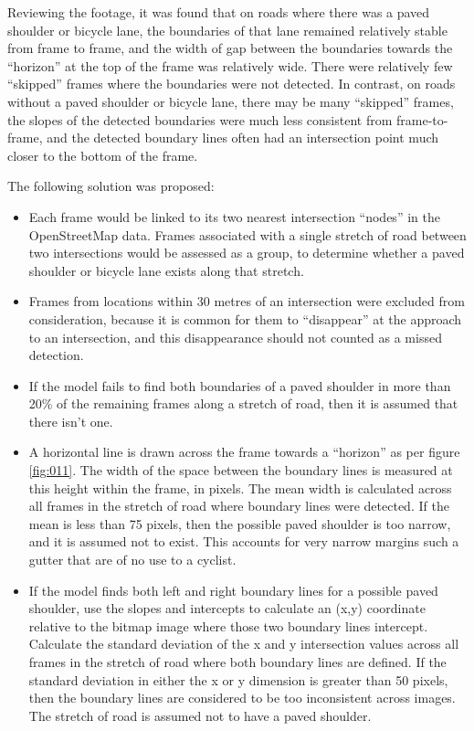 \documentclass[11pt,twoside]{report}
\begin{document}
Reviewing the footage, it was found that on roads where there was a paved shoulder or bicycle lane, the boundaries of that lane remained relatively stable from frame to frame, and the width of gap between the boundaries towards the ``horizon'' at the top of the frame was relatively wide.  There were relatively few ``skipped'' frames where the boundaries were not detected.  In contrast, on roads without a paved shoulder or bicycle lane, there may be many ``skipped'' frames, the slopes of the detected boundaries were much less consistent from frame-to-frame, and the detected boundary lines often had an intersection point much closer to the bottom of the frame.

The following solution was proposed:

\begin{itemize}
\item{Each frame would be linked to its two nearest intersection ``nodes'' in the  OpenStreetMap data.  Frames associated with a single stretch of road between two intersections would be assessed as a group, to determine whether a paved shoulder or bicycle lane exists along that stretch.}
\item{Frames from locations within 30 metres of an intersection were excluded from consideration, because it is common for them to ``disappear'' at the approach to an intersection, and this disappearance should not counted as a missed detection.}
\item{If the model fails to find both boundaries of a paved shoulder in more than 20\% of the remaining frames along a stretch of road, then it is assumed that there isn't one.}
\item{A horizontal line is drawn across the frame towards a ``horizon'' as per figure \ref{fig:011}.  The width of the space between the boundary lines is measured at this height within the frame, in pixels.  The mean width is calculated across all frames in the stretch of road where boundary lines were detected.  If the mean is less than 75 pixels, then the possible paved shoulder is too narrow, and it is assumed not to exist.  This accounts for very narrow margins such a gutter that are of no use to a cyclist.}
\item{If the model finds both left and right boundary lines for a possible paved shoulder, use the slopes and intercepts to calculate an (x,y) coordinate relative to the bitmap image where those two boundary lines intercept.  Calculate the standard deviation of the x and y intersection values across all frames in the stretch of road where both boundary lines are defined.  If the standard deviation in either the x or y dimension is greater than 50 pixels, then the boundary lines are considered to be too inconsistent across images.  The stretch of road is assumed not to have a paved shoulder.}
\end{itemize}
\end{document}
